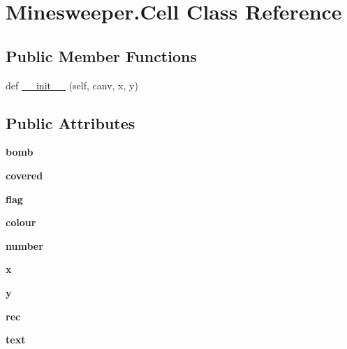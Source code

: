\hypertarget{class_minesweeper_1_1_cell}{}\section{Minesweeper.\+Cell Class Reference}
\label{class_minesweeper_1_1_cell}
\subsection*{Public Member Functions}
\begin{DoxyCompactItemize}
\item 
def \mbox{\hyperlink{class_minesweeper_1_1_cell_a90721693b3d271396e733f3ca07047bb}{\+\_\+\+\_\+init\+\_\+\+\_\+}} (self, canv, x, y)
\end{DoxyCompactItemize}
\subsection*{Public Attributes}
\begin{DoxyCompactItemize}
\item 
\mbox{\label{class_minesweeper_1_1_cell_a000d851a541610c56ccf0349ddf5f776}} 
{\bfseries bomb}
\item 
\mbox{\label{class_minesweeper_1_1_cell_a653576bdebef499c33f4524a7ee600a7}} 
{\bfseries covered}
\item 
\mbox{\label{class_minesweeper_1_1_cell_a2e33a55c655454ce377782ded157b664}} 
{\bfseries flag}
\item 
\mbox{\label{class_minesweeper_1_1_cell_a82e01dd86aa369154851a54ee7222164}} 
{\bfseries colour}
\item 
\mbox{\label{class_minesweeper_1_1_cell_af3854ccbd0a2ca953b45655a4360a615}} 
{\bfseries number}
\item 
\mbox{\label{class_minesweeper_1_1_cell_a5c5d302cd2b3122697b640050f972546}} 
{\bfseries x}
\item 
\mbox{\label{class_minesweeper_1_1_cell_a3830d10cca0068e628c9d827b83471eb}} 
{\bfseries y}
\item 
\mbox{\label{class_minesweeper_1_1_cell_ac3832775810d6450566a2b42e9bbbf51}} 
{\bfseries rec}
\item 
\mbox{\label{class_minesweeper_1_1_cell_ae5f9fce7697c32148670687c1c5de8aa}} 
{\bfseries text}
\end{DoxyCompactItemize}


